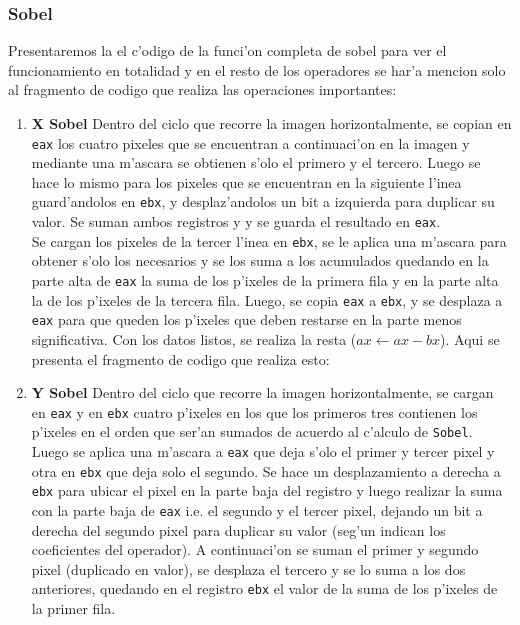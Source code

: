 \documentclass[11pt]{article}
\begin{document}
\subsubsection{Sobel}
Presentaremos la el c'odigo de la funci'on completa de sobel para ver el funcionamiento en totalidad y en el resto de los operadores se har'a mencion solo al fragmento de codigo que realiza las operaciones importantes:
\begin{enumerate}
\item \textbf{X Sobel}
\subitem Dentro del ciclo que recorre la imagen horizontalmente, se copian en \verb'eax' los cuatro pixeles que se encuentran a continuaci'on en la imagen y mediante una m'ascara se obtienen s'olo el primero y el tercero. Luego se hace lo mismo para los pixeles que se encuentran en la siguiente l'inea guard'andolos en \verb'ebx', y desplaz'andolos un bit a izquierda para duplicar su valor. Se suman ambos registros y y se guarda el resultado en \verb'eax'.\\
Se cargan los pixeles de la tercer l'inea en \verb'ebx', se le aplica una m'ascara para obtener s'olo los necesarios y se los suma a los acumulados quedando en la parte alta de \verb'eax' la suma de los p'ixeles de la primera fila y en la parte alta la de los p'ixeles de la tercera fila. Luego, se copia  \verb'eax' a \verb'ebx', y se desplaza a \verb'eax' para que queden los p'ixeles que deben restarse en la parte menos significativa. 
Con los datos listos, se realiza la resta ($ax \leftarrow ax - bx$). Aqui se presenta el fragmento de codigo que realiza esto:
\item \textbf{Y Sobel}
\subitem Dentro del ciclo que recorre la imagen horizontalmente, se cargan en \verb'eax' y en \verb'ebx' cuatro p'ixeles en los que los primeros tres contienen los p'ixeles en el orden que ser'an sumados de acuerdo al c'alculo de \verb'Sobel'.\\
Luego se aplica una m'ascara a \verb'eax' que deja s'olo el primer y tercer pixel y otra en \verb'ebx' que deja solo el segundo. Se hace un desplazamiento a derecha a \verb'ebx' para ubicar el pixel en la parte baja del registro y luego realizar la suma con la parte baja de \verb'eax' i.e. el segundo y el tercer pixel, dejando un bit a derecha del segundo pixel para duplicar su valor (seg'un indican los coeficientes del operador). A continuaci'on se suman el primer y segundo pixel (duplicado en valor), se desplaza el tercero y se lo suma a los dos anteriores, quedando en el registro \verb'ebx' el valor de la suma de los p'ixeles de la primer fila.\\

\end{enumerate}
\end{document}
